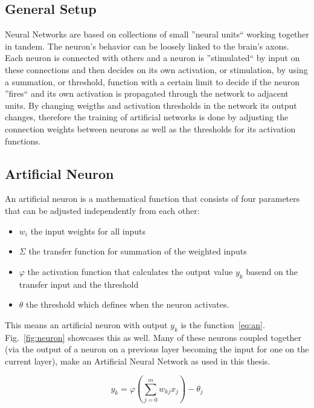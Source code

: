\subsection{General Setup}
\label{sec:fund:general}
Neural Networks are based on collections of small ''neural units``  working together in tandem. The neuron's behavior can be loosely linked to the brain's axons. Each neuron is connected with others and a neuron is ''stimulated`` by input on these connections and then decides on its own activation, or stimulation, by using a summation, or threshold, function with a certain limit to decide if the neuron ''fires`` and its own activation is propagated through the network to adjacent units. By changing weigths and activation thresholds in the network its output changes, therefore the training of artificial networks is done by adjusting the connection weights between neurons as well as the thresholds for its activation functions. 
\subsection{Artificial Neuron}
\label{sec:fund:AN}

An artificial neuron is a mathematical function that consists of four parameters that can be adjusted independently from each other:
\begin{itemize}
\item \(w_i\) the input weights for all inputs
\item \(\Sigma\) the transfer function for summation of the weighted inputs
\item \(\varphi\) the activation function that calculates the output value \(y_k\) basend on the transfer input and the threshold
\item \(\theta\) the threshold which defines when the neuron activates.
\end{itemize}

This means an artificial neuron with output \(y_k\) is the function~\ref{eq:an}. Fig.~\ref{fig:neuron} showcases this as well. Many of these neurons coupled together (via the output of a neuron on a previous layer becoming the input for one on the current layer), make an Artificial Neural Network as used in this thesis. 

\begin{equation}
y_k = \varphi(\sum_{j=0}^{m} w_{kj}x_j) - \theta_j
\label{eq:an}
\end{equation}

